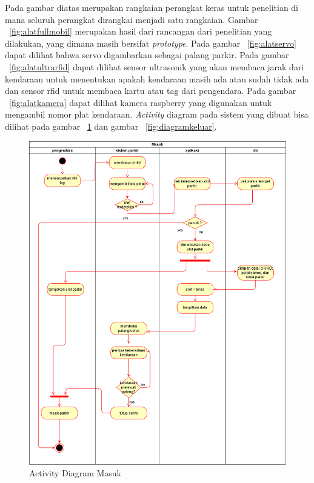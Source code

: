 Pada gambar diatas merupakan rangkaian perangkat keras untuk penelitian di mana seluruh perangkat dirangkai menjadi satu rangkaian.  Gambar ~\ref{fig:alatfullmobil} merupakan hasil dari rancangan dari penelitian yang dilakukan, yang dimana masih bersifat \textit{prototype}. Pada gambar ~\ref{fig:alatservo} dapat dilihat bahwa servo digambarkan sebagai palang parkir. Pada gambar ~\ref{fig:alatultrarfid} dapat dilihat sensor ultrasonik yang akan membaca jarak dari kendaraan untuk menentukan apakah kendaraan masih ada atau sudah tidak ada dan sensor rfid untuk membaca kartu atau tag dari pengendara. Pada gambar ~\ref{fig:alatkamera} dapat dilihat kamera raspberry yang digunakan untuk mengambil nomor plat kendaraan. \textit{Activity} diagram pada sistem yang dibuat bisa dilihat pada gambar ~\ref{fig:diagrammasuk} dan gambar ~\ref{fig:diagramkeluar}.\newline

\begin{figure} [H]
    \includegraphics[width=1\textwidth, center]{images/activity diagram skripsi masuk.png}
    \caption{Activity Diagram Masuk}
    \label{fig:diagrammasuk}
\end{figure}

